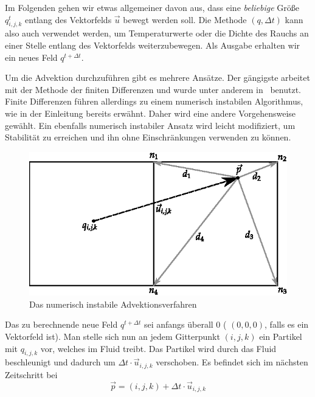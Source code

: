 Im Folgenden gehen wir etwas allgemeiner davon aus, dass eine
\emph{beliebige} Größe $q_{i,j,k}^{t}$ entlang des Vektorfelds
$\vec{u}$ bewegt werden soll. Die Methode
$(q,\Delta t)$ kann also auch verwendet
werden, um Temperaturwerte oder die Dichte des Rauchs an einer Stelle
entlang des Vektorfelds weiterzubewegen. Als Ausgabe erhalten wir ein
neues Feld $q^{t+\Delta t}$.

Um die Advektion durchzuführen gibt es mehrere Ansätze. Der gängigste
arbeitet mit der Methode der finiten Differenzen und wurde unter
anderem in~\cite{Foster} benutzt. Finite Differenzen führen allerdings
zu einem numerisch instabilen Algorithmus, wie in der Einleitung
bereits erwähnt. Daher wird eine andere Vorgehensweise gewählt. Ein
ebenfalls numerisch instabiler Ansatz wird leicht modifiziert, um
Stabilität zu erreichen und ihn ohne Einschränkungen verwenden zu
können.

\begin{figure}[h]
\centering
%
\includegraphics[width=12cm]{images/advection_bad}
\caption{Das numerisch instabile Advektionsverfahren}
\label{fig:stam_numerically_unstable_advection}
\end{figure}

Das zu berechnende neue Feld $q^{t+\Delta t}$ sei anfangs
überall 0 (\Pimiddybzw{} $(0,0,0)$, falls es ein Vektorfeld ist). Man stelle
sich nun an jedem Gitterpunkt $(i,j,k)$ ein Partikel mit
 $q_{i,j,k}$ vor, welches im Fluid treibt. Das
Partikel wird durch das Fluid beschleunigt und dadurch um $\Delta t
\cdot \vec{u}_{i,j,k}$ verschoben. Es befindet sich im nächsten
Zeitschritt bei
\begin{equation}
\vec{p}=(i,j,k)+\Delta t \cdot \vec{u}_{i,j,k}
\end{equation}

